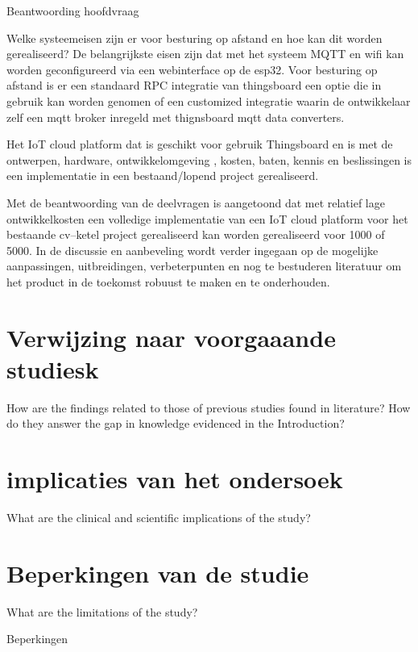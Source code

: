 		
		Beantwoording hoofdvraag
		
		Welke systeemeisen zijn er voor besturing op afstand en hoe kan dit worden gerealiseerd?
		De belangrijkste eisen zijn dat met het systeem MQTT en wifi kan worden geconfigureerd via een webinterface op de esp32.
		Voor besturing op afstand is er een standaard RPC integratie van thingsboard een optie die in gebruik kan worden genomen of een customized integratie waarin de ontwikkelaar zelf een mqtt broker inregeld met thignsboard mqtt data converters.
		
		Het IoT cloud platform  dat is geschikt voor gebruik  Thingsboard  en is met de ontwerpen, hardware, ontwikkelomgeving , kosten, baten, kennis  en beslissingen is een implementatie in een bestaand/lopend project gerealiseerd.
		
		
		
		Met de beantwoording van de deelvragen is aangetoond dat met relatief lage ontwikkelkosten een volledige implementatie van een IoT cloud platform voor het bestaande cv–ketel project gerealiseerd kan worden gerealiseerd voor 1000 of 5000. In de discussie en aanbeveling wordt verder ingegaan op de mogelijke aanpassingen, uitbreidingen, verbeterpunten en nog te bestuderen literatuur om het product in de toekomst robuust te maken en te onderhouden.
		\section{Verwijzing naar voorgaaande studiesk}
		How are the findings related to those of previous studies found in literature? How do they answer the gap in knowledge evidenced in the Introduction?
		
		\section{implicaties van het ondersoek}
		
		What are the clinical and scientific implications of the study?
		
		\section{Beperkingen van de studie}
		What are the limitations of the study?
		
		
		Beperkingen
		
